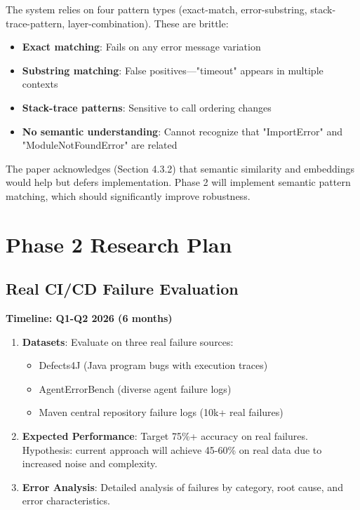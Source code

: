 \documentclass[11pt]{article}
\begin{document}
The system relies on four pattern types (exact-match, error-substring, stack-trace-pattern, layer-combination). These are brittle:

\begin{itemize}
    \item \textbf{Exact matching}: Fails on any error message variation
    \item \textbf{Substring matching}: False positives—"timeout" appears in multiple contexts
    \item \textbf{Stack-trace patterns}: Sensitive to call ordering changes
    \item \textbf{No semantic understanding}: Cannot recognize that "ImportError" and "ModuleNotFoundError" are related
\end{itemize}

The paper acknowledges (Section 4.3.2) that semantic similarity and embeddings would help but defers implementation. Phase 2 will implement semantic pattern matching, which should significantly improve robustness.

\section{Phase 2 Research Plan}
\label{sec:phase2_plan}

\subsection{Real CI/CD Failure Evaluation}

\textbf{Timeline: Q1-Q2 2026 (6 months)}

\begin{enumerate}
    \item \textbf{Datasets}: Evaluate on three real failure sources:
    \begin{itemize}
        \item Defects4J (Java program bugs with execution traces)
        \item AgentErrorBench (diverse agent failure logs)
        \item Maven central repository failure logs (10k+ real failures)
    \end{itemize}

    \item \textbf{Expected Performance}: Target 75\%+ accuracy on real failures. Hypothesis: current approach will achieve 45-60\% on real data due to increased noise and complexity.

    \item \textbf{Error Analysis}: Detailed analysis of failures by category, root cause, and error characteristics.
\end{enumerate}
\end{document}
